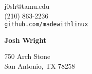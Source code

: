 \documentclass[12pt]{article}
\begin{document}
\noindent
\setlength{\parskip}{-1pt}
\sffamily

\begin{minipage}{0.3\linewidth}
\begin{flushleft}
j0sh@tamu.edu\\
(210) 863-2236\\
\verb|github.com/madewithlinux|
\end{flushleft}
\end{minipage}
\hfill
\begin{minipage}{0.3\linewidth}
\begin{center}
{\Huge\textbf{Josh Wright}}
\end{center}
\end{minipage}
\hfill
\begin{minipage}{0.3\linewidth}
\begin{flushright}
750 Arch Stone\\
San Antonio, TX 78258
\end{flushright}
\end{minipage}
\end{document}
